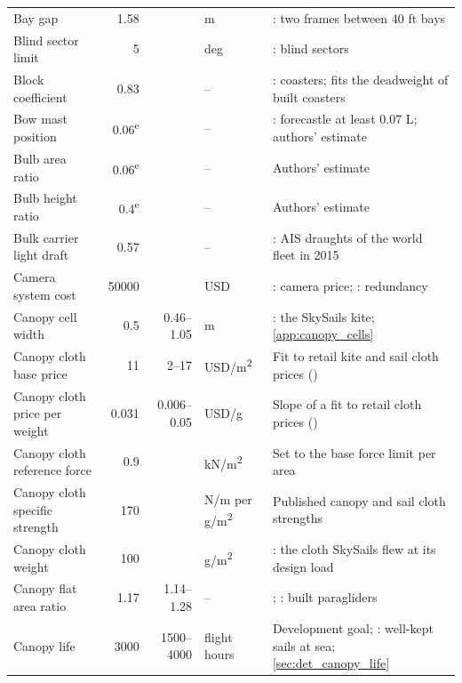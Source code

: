 \begin{longtable}{@{}>{\raggedright\arraybackslash}p{3.4cm}rr>{\raggedright\arraybackslash}p{1.4cm}>{\raggedright\arraybackslash}p{5.8cm}@{}}
Bay gap & \num{1.58} &  & m & \citet[Tables A.6.2-A.6.3]{souadji2012}: two frames between 40 ft bays \\
Blind sector limit & \num{5} &  & deg & \citet[SOLAS V/22.1.2]{dma2019solas}: blind sectors \\
Block coefficient & \num{0.83} &  & -- & \citet{man2011}: coasters; fits the deadweight of built coasters \\
Bow mast position & \num{0.06}\textsuperscript{e} &  & -- & \citet[42.20-70]{cfr46_part42}: forecastle at least 0.07 L; authors' estimate \\
Bulb area ratio & \num{0.06}\textsuperscript{e} &  & -- & Authors' estimate \\
Bulb height ratio & \num{0.4}\textsuperscript{e} &  & -- & Authors' estimate \\
Bulk carrier light draft & \num{0.57} &  & -- & \citet[Appendix J]{olmer2017}: AIS draughts of the world fleet in 2015 \\
Camera system cost & \num{50000} &  & USD & \citet{thegpsstore2026flir}: camera price; \citet[para. 4]{imo2012circ1350}: redundancy \\
Canopy cell width & \num{0.5} & \num{0.46}--\num{1.05} & m & \citet[Table 1 and sec. 2.2]{folkersma2020}: the SkySails kite; \cref{app:canopy_cells} \\
Canopy cloth base price & \num{11} & \num{2}--\num{17} & USD/m\textsuperscript{2} & Fit to retail kite and sail cloth prices (\citealp{extremtextil_prices_2026}) \\
Canopy cloth price per weight & \num{0.031} & \num{0.006}--\num{0.05} & USD/g & Slope of a fit to retail cloth prices (\citealp{extremtextil_prices_2026}) \\
Canopy cloth reference force & \num{0.9} &  & kN/m\textsuperscript{2} & Set to the base force limit per area \\
Canopy cloth specific strength & \num{170} &  & N/m per g/m\textsuperscript{2} & Published canopy and sail cloth strengths \\
Canopy cloth weight & \num{100} &  & g/m\textsuperscript{2} & \citet[p. 561]{paulig2013}: the cloth SkySails flew at its design load \\
Canopy flat area ratio & \num{1.17} & \num{1.14}--\num{1.28} & -- & \citet{ozone_ultralite4}; \citet{advance_alpha8}: built paragliders \\
Canopy life & \num{3000} & \num{1500}--\num{4000} & flight hours & Development goal; \citet{flynn2015}: well-kept sails at sea; \cref{sec:det_canopy_life} \\

\end{longtable}
